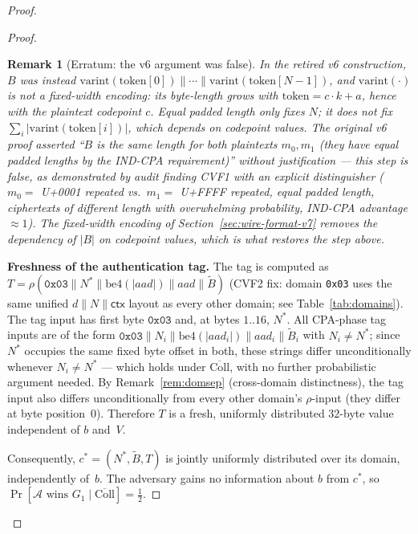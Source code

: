 \documentclass[11pt,a4paper]{article}
\newtheorem{remark}[theorem]{Remark}
\begin{document}
\begin{proof}
\begin{proof}
\begin{remark}[Erratum: the v6 argument was false]
\label{sec:hiding-lemma-erratum}
In the retired v6 construction, $B$ was instead
$\mathrm{varint}(\mathrm{token}[0]) \| \cdots \| \mathrm{varint}(\mathrm{token}[N-1])$,
and $\mathrm{varint}(\cdot)$ is \emph{not} a fixed-width encoding: its
byte-length grows with $\mathrm{token} = c \cdot k + a$, hence with the
plaintext codepoint $c$. Equal padded length only fixes $N$; it does not fix
$\sum_i \lvert \mathrm{varint}(\mathrm{token}[i]) \rvert$, which depends on
codepoint \emph{values}. The original v6 proof asserted ``$B$ is the same
length for both plaintexts $m_0, m_1$ (they have equal padded lengths by the
IND-CPA requirement)'' without justification --- this step is false, as
demonstrated by audit finding CVF1 with an explicit distinguisher
($m_0 = $ U+0001 repeated vs.\ $m_1 = $ U+FFFF repeated, equal padded
length, ciphertexts of different length with overwhelming probability, IND-CPA
advantage $\approx 1$). The fixed-width encoding of
Section~\ref{sec:wire-format-v7} removes the dependency of $|B|$ on
codepoint values, which is what restores the step above.
\end{remark}

\smallskip
\noindent\textbf{Freshness of the authentication tag.}
The tag is computed as
$T = \rho(\texttt{0x03}\|N^*\|\mathrm{be4}(|aad|)\|aad\|\tilde{B})$
(CVF2 fix: domain \texttt{0x03} uses the same unified $d\|N\|\mathsf{ctx}$
layout as every other domain; see Table~\ref{tab:domains}).
The tag input has first byte $\texttt{0x03}$ and, at bytes $1..16$, $N^*$.
All CPA-phase tag inputs are of the form
$\texttt{0x03}\|N_i\|\mathrm{be4}(|aad_i|)\|aad_i\|\tilde{B}_i$ with $N_i \neq N^*$;
since $N^*$ occupies the same fixed byte offset in both, these strings differ
unconditionally whenever $N_i \neq N^*$ --- which holds under
$\overline{\mathrm{Coll}}$, with no further probabilistic argument needed.
By Remark~\ref{rem:domsep} (cross-domain distinctness), the tag input also
differs unconditionally from every other domain's $\rho$-input (they differ
at byte position~$0$).
Therefore $T$ is a fresh, uniformly distributed $32$-byte value independent
of $b$ and~$V$.

Consequently, $c^*=(N^*,\tilde{B},T)$ is jointly uniformly distributed
over its domain, independently of~$b$.  The adversary gains no information
about $b$ from $c^*$, so
$\Pr[\mathcal{A}\text{ wins }G_1\mid\overline{\mathrm{Coll}}]=\tfrac{1}{2}$.
\end{proof}


\end{proof}
\end{document}
